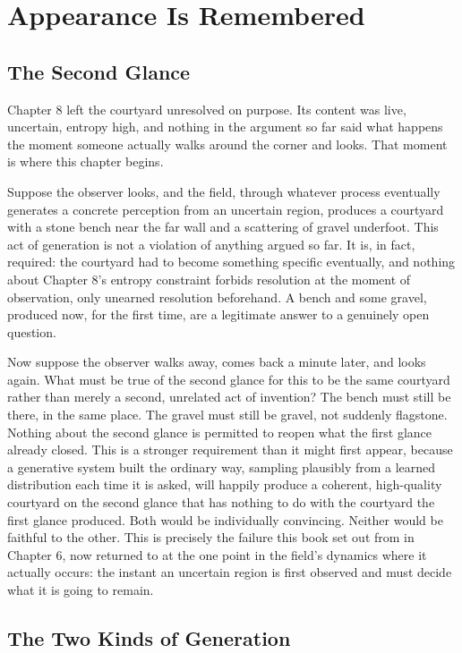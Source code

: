 \chapter{Appearance Is Remembered}

\section{The Second Glance}

Chapter 8 left the courtyard unresolved on purpose. Its content was live, uncertain, entropy high, and nothing in the argument so far said what happens the moment someone actually walks around the corner and looks. That moment is where this chapter begins.

Suppose the observer looks, and the field, through whatever process eventually generates a concrete perception from an uncertain region, produces a courtyard with a stone bench near the far wall and a scattering of gravel underfoot. This act of generation is not a violation of anything argued so far. It is, in fact, required: the courtyard had to become something specific eventually, and nothing about Chapter 8's entropy constraint forbids resolution at the moment of observation, only unearned resolution beforehand. A bench and some gravel, produced now, for the first time, are a legitimate answer to a genuinely open question.

Now suppose the observer walks away, comes back a minute later, and looks again. What must be true of the second glance for this to be the same courtyard rather than merely a second, unrelated act of invention? The bench must still be there, in the same place. The gravel must still be gravel, not suddenly flagstone. Nothing about the second glance is permitted to reopen what the first glance already closed. This is a stronger requirement than it might first appear, because a generative system built the ordinary way, sampling plausibly from a learned distribution each time it is asked, will happily produce a coherent, high-quality courtyard on the second glance that has nothing to do with the courtyard the first glance produced. Both would be individually convincing. Neither would be faithful to the other. This is precisely the failure this book set out from in Chapter 6, now returned to at the one point in the field's dynamics where it actually occurs: the instant an uncertain region is first observed and must decide what it is going to remain.

\section{The Two Kinds of Generation}

